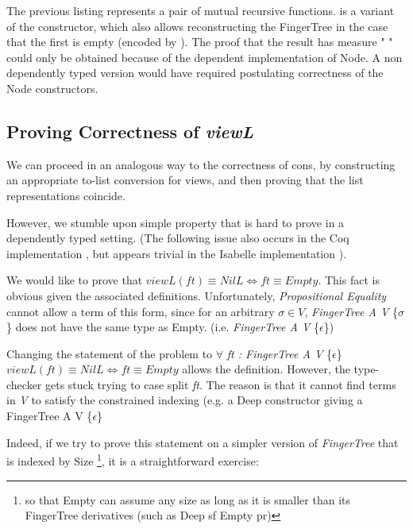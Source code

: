 \documentclass[12pt,twoside,notitlepage]{report}
\begin{document}
The previous listing represents a pair of mutual recursive functions.  is a variant of the  constructor, which also allows reconstructing the FingerTree in the case that the first  is empty (encoded by ). The proof that the result has measure "      " could only be obtained because of the dependent implementation of Node. A non dependently typed version would have required postulating correctness of the Node constructors. 


\subsection{Proving Correctness of \textit{viewL}}

We can proceed in an analogous way to the correctness of cons, by constructing an appropriate to-list conversion for views, and then proving that the list representations coincide.

However, we stumble upon simple property that is hard to prove in a dependently typed setting. (The following issue also occurs in the Coq implementation \cite{coq}, but appears trivial in the Isabelle implementation \cite{isabelle}).

We would like to prove that $viewL(ft)\equiv NilL \iff ft \equiv Empty$. This fact is obvious given the associated definitions. Unfortunately, \textit{Propositional Equality} cannot allow a term of this form, since for an arbitrary $\sigma \in V$, \textit{FingerTree A V} \{$\sigma$\} does not have the same type as Empty. (i.e. \textit{FingerTree A V} \{$\epsilon$\})

Changing the statement of the problem to $\forall$ \textit{ft : FingerTree A V} \{$\epsilon$\} $viewL(ft) \equiv NilL \iff ft \equiv Empty$ allows the definition. However, the type-checker gets stuck trying to case split \textit{ft}. The reason is that it cannot find terms in \textit{V} to satisfy the constrained indexing (e.g. a Deep constructor giving a FingerTree A V \{$\epsilon$\}\

Indeed, if we try to prove this statement on a simpler version of \textit{FingerTree} that is indexed by Size \footnote{so that Empty can assume any size as long as it is smaller than its FingerTree derivatives (such as Deep sf Empty pr)}, it is a straightforward exercise: 
\end{document}
